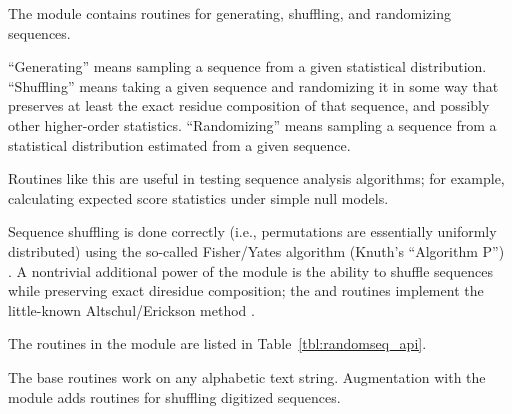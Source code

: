 The  module contains routines for generating,
shuffling, and randomizing sequences.

``Generating'' means sampling a sequence from a given statistical
distribution. ``Shuffling'' means taking a given sequence and
randomizing it in some way that preserves at least the exact residue
composition of that sequence, and possibly other higher-order
statistics. ``Randomizing'' means sampling a sequence from a
statistical distribution estimated from a given sequence.

Routines like this are useful in testing sequence analysis algorithms;
for example, calculating expected score statistics under simple null
models. 

Sequence shuffling is done correctly (i.e., permutations are
essentially uniformly distributed) using the so-called Fisher/Yates
algorithm (Knuth's ``Algorithm P'') \citep{Durstenfeld64,Knu-81a}.  A
nontrivial additional power of the module is the ability to shuffle
sequences while preserving exact diresidue composition; the
 and 
routines implement the little-known Altschul/Erickson method
\citep{AltschulErickson86}.

The routines in the module are listed in
Table~\ref{tbl:randomseq_api}.

The base routines work on any alphabetic text string.  Augmentation
with the  module adds routines for shuffling
digitized sequences.


